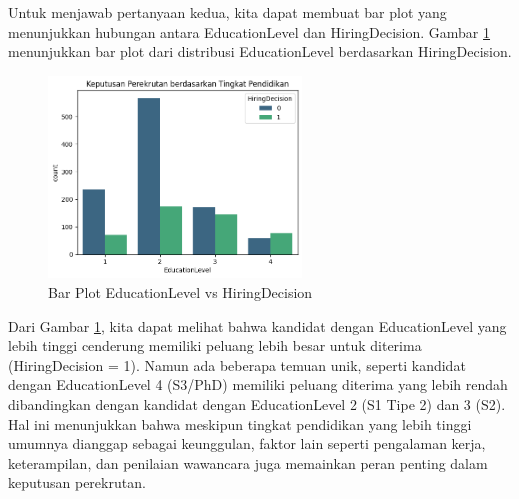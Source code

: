 


Untuk menjawab pertanyaan kedua, kita dapat membuat bar plot yang menunjukkan hubungan antara EducationLevel dan HiringDecision. Gambar \ref{fig:barplot3} menunjukkan bar plot dari distribusi EducationLevel berdasarkan HiringDecision.

\begin{figure}[H]
    \centering
    \includegraphics[width=0.6\textwidth]{gambar/barplot3.png}
    \caption{Bar Plot EducationLevel vs HiringDecision}
    \label{fig:barplot3}
\end{figure}

Dari Gambar \ref{fig:barplot3}, kita dapat melihat bahwa kandidat dengan EducationLevel yang lebih tinggi cenderung memiliki peluang lebih besar untuk diterima (HiringDecision = 1). Namun ada beberapa temuan unik, seperti kandidat dengan EducationLevel 4 (S3/PhD) memiliki peluang diterima yang lebih rendah dibandingkan dengan kandidat dengan EducationLevel 2 (S1 Tipe 2) dan 3 (S2). Hal ini menunjukkan bahwa meskipun tingkat pendidikan yang lebih tinggi umumnya dianggap sebagai keunggulan, faktor lain seperti pengalaman kerja, keterampilan, dan penilaian wawancara juga memainkan peran penting dalam keputusan perekrutan.

